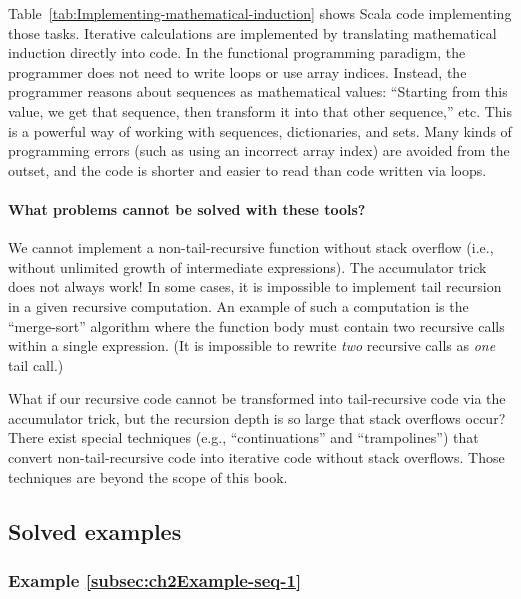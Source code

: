 \noindent Table~\ref{tab:Implementing-mathematical-induction} shows
Scala code implementing those tasks. Iterative calculations are implemented
by translating mathematical induction directly into code. In the functional
programming paradigm, the programmer does not need to write loops
or use array indices. Instead, the programmer reasons about sequences
as mathematical values: \textsf{``}Starting from this value, we get that sequence,
then transform it into that other sequence,\textsf{''} etc. This is a powerful
way of working with sequences, dictionaries, and sets. Many kinds
of programming errors (such as using an incorrect array index) are
avoided from the outset, and the code is shorter and easier to read
than code written via loops.

\paragraph*{What problems cannot be solved with these tools?}

We cannot implement a non-tail-recursive function without stack overflow
(i.e., without unlimited growth of intermediate expressions). The
accumulator trick does not always work! In some cases, it is impossible
to implement tail recursion in a given recursive computation. An example
of such a computation is the \textsf{``}merge-sort\textsf{''} algorithm where the
function body must contain two recursive calls within a single expression.
(It is impossible to rewrite \emph{two} recursive calls as \emph{one}
tail call.) 

What if our recursive code cannot be transformed into tail-recursive
code via the accumulator trick, but the recursion depth is so large
that stack overflows occur? There exist special techniques (e.g.,
\textsf{``}continuations\textsf{''} and \textsf{``}trampolines\textsf{''})
that convert non-tail-recursive code into iterative code without stack
overflows. Those techniques are beyond the scope of this book.

\subsection{Solved examples}

\subsubsection{Example \label{subsec:ch2Example-seq-1}\ref{subsec:ch2Example-seq-1}}

